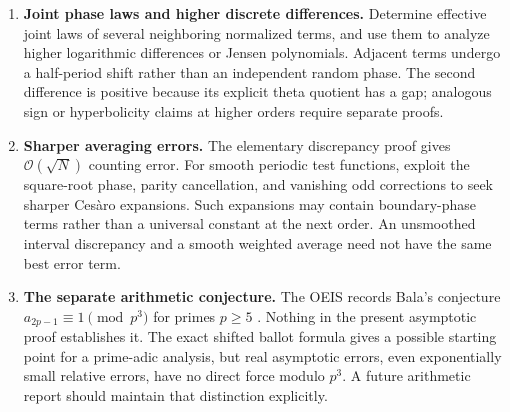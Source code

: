 \documentclass[11pt,a4paper]{article}
\numberwithin{equation}{section}
\theoremstyle{definition}
\newcommand{\OO}{\mathcal O}
\begin{document}
\begin{enumerate}[leftmargin=*,label=\textbf{Q\arabic*.}]
\emph{[Write note, batch 98D, 5 October 2026.]} The question is answered
in a sufficient-hypothesis form by Part~II. Its
Theorem~\ref{tbs:lpt:thm:transfer} gives the theta limit for a general
positive array under a local quadratic law, a Gaussian majorant and
interior completeness, with arbitrary drifting phase;
Theorem~\ref{tbs:lpt:thm:allorders} gives every fixed order through a
Bell-polynomial recurrence, and Theorem~\ref{tbs:lpt:thm:multi} the
multidimensional version with a quadratic-form theta function. This
report's critical regime satisfies the hypotheses
(Proposition~\ref{tbs:lpt:prop:ballot}), and so does the Mahonian
report's critical window once the Gaussian majorant is weakened to an
exponential one, which log-concavity supplies
(Proposition~\ref{tbs:lpt:prop:mahonian}). The sentence above that ``this
question stays open'' is therefore superseded. Still open are a
characterization, degenerate, boundary and multiple peaks, and concrete
weighted-meander or multidimensional applications
(Section~\ref{tbs:lpt:sec:questions}). In Part~II's notation the
Mahonian $Z_\delta(q)$ and this report's $\Theta_{q/8}(\delta)$ are both
$\vartheta(q,\delta)$ (equation~\eqref{tbs:lpt:eq:dictionary}).

\item \textbf{Joint phase laws and higher discrete differences.}
Determine effective joint laws of several neighboring normalized terms,
and use them to analyze higher logarithmic differences or Jensen
polynomials. Adjacent terms undergo a half-period shift rather than an
independent random phase. The second difference is positive because its
explicit theta quotient has a gap; analogous sign or hyperbolicity
claims at higher orders require separate proofs.

\item \textbf{Sharper averaging errors.}
The elementary discrepancy proof gives $\OO(\sqrt N)$ counting error.
For smooth periodic test functions, exploit the square-root phase,
parity cancellation, and vanishing odd corrections to seek sharper
Ces\`aro expansions. Such expansions may contain boundary-phase terms
rather than a universal constant at the next order. An unsmoothed
interval discrepancy and a smooth weighted average need not have the
same best error term.

\item \textbf{The separate arithmetic conjecture.}
The OEIS records Bala's conjecture
$a_{2p-1}\equiv1\pmod{p^3}$ for primes $p\ge5$ \cite{oeisa}.
Nothing in the present asymptotic proof establishes it. The exact shifted
ballot formula gives a possible starting point for a prime-adic analysis,
but real asymptotic errors, even exponentially small relative errors,
have no direct force modulo $p^3$. A future arithmetic report should
maintain that distinction explicitly.


\end{enumerate}
\end{document}
